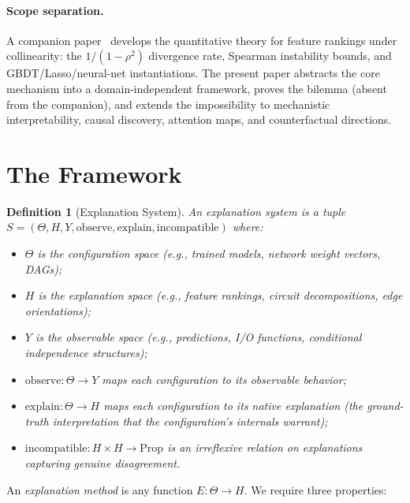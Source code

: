 \documentclass{article}
\newtheorem{definition}[theorem]{Definition}
\begin{document}
\paragraph{Scope separation.}
A companion paper~\citep{anonymous2026attribution} develops the
quantitative theory for feature rankings under collinearity: the
$1/(1{-}\rho^2)$ divergence rate, Spearman instability bounds, and
GBDT/Lasso/neural-net instantiations.
The present paper abstracts the core mechanism into a domain-independent
framework, proves the bilemma (absent from the companion),
and extends the impossibility to mechanistic interpretability,
causal discovery, attention maps, and counterfactual directions.

\section{The Framework}
\label{sec:framework}

\begin{definition}[Explanation System]
\label{def:explanation-system}
An \emph{explanation system} is a tuple $S = (\Theta, H, Y,
\mathrm{observe}, \mathrm{explain}, \mathrm{incompatible})$ where:
\begin{itemize}[leftmargin=*]
\item $\Theta$ is the \emph{configuration space} (e.g., trained models,
  network weight vectors, DAGs);
\item $H$ is the \emph{explanation space} (e.g., feature rankings, circuit
  decompositions, edge orientations);
\item $Y$ is the \emph{observable space} (e.g., predictions, I/O functions,
  conditional independence structures);
\item $\mathrm{observe} : \Theta \to Y$ maps each configuration to its
  observable behavior;
\item $\mathrm{explain} : \Theta \to H$ maps each configuration to its
  \emph{native} explanation (the ground-truth interpretation that the
  configuration's internals warrant);
\item $\mathrm{incompatible} : H \times H \to \mathrm{Prop}$ is an
  irreflexive relation on explanations capturing genuine disagreement.
\end{itemize}
\end{definition}

An \emph{explanation method} is any function $E : \Theta \to H$.
We require three properties:
\end{document}
